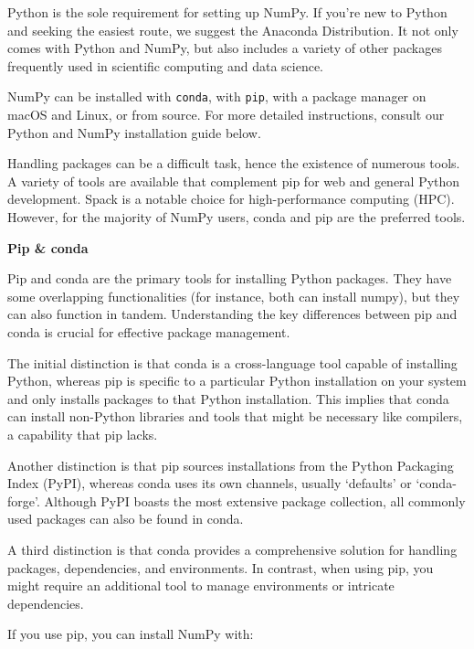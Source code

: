 Python is the sole requirement for setting up NumPy. If you're new to Python and seeking the easiest route, we suggest the Anaconda Distribution. It not only comes with Python and NumPy, but also includes a variety of other packages frequently used in scientific computing and data science.

NumPy can be installed with \texttt{conda}, with \texttt{pip}, with a package manager on macOS and Linux, or from source. For more detailed instructions, consult our Python and NumPy installation guide below.

Handling packages can be a difficult task, hence the existence of numerous tools. A variety of tools are available that complement pip for web and general Python development. Spack is a notable choice for high-performance computing (HPC). However, for the majority of NumPy users, conda and pip are the preferred tools.

\textbf{Pip \& conda}

\bigskip

Pip and conda are the primary tools for installing Python packages. They have some overlapping functionalities (for instance, both can install numpy), but they can also function in tandem. Understanding the key differences between pip and conda is crucial for effective package management.

\bigskip

The initial distinction is that conda is a cross-language tool capable of installing Python, whereas pip is specific to a particular Python installation on your system and only installs packages to that Python installation. This implies that conda can install non-Python libraries and tools that might be necessary like compilers, a capability that pip lacks.

\bigskip

Another distinction is that pip sources installations from the Python Packaging Index (PyPI), whereas conda uses its own channels, usually ‘defaults’ or ‘conda-forge’. Although PyPI boasts the most extensive package collection, all commonly used packages can also be found in conda.

\bigskip

A third distinction is that conda provides a comprehensive solution for handling packages, dependencies, and environments. In contrast, when using pip, you might require an additional tool to manage environments or intricate dependencies.

\bigskip

If you use pip, you can install NumPy with:	

